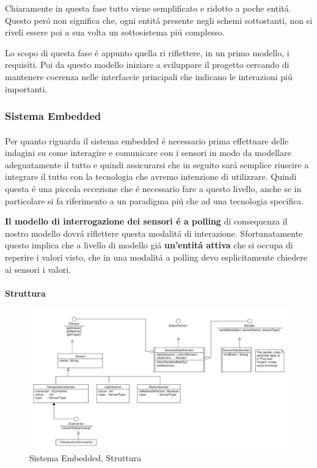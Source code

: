 Chiaramente in questa fase tutto viene semplificato e ridotto a poche entit\'a. Questo per\'o non significa che, ogni entit\'a presente negli schemi sottostanti, non si riveli essere poi a sua volta un sottosistema pi\'u complesso.

Lo scopo di questa fase \'e appunto quella ri riflettere, in un primo modello, i requisiti. Poi da questo modello iniziare a sviluppare il progetto cercando di mantenere coerenza nelle interfaccie principali che indicano le interazioni pi\'u importanti.

\subsubsection{Sistema Embedded}

\paragraph{}Per quanto riguarda il sistema embedded \'e necessario prima effettuare delle indagini su come interagire e comunicare con i sensori in modo da modellare adeguatamente il tutto e quindi assicurarsi che in seguito sar\'a semplice riuscire a integrare il tutto con la tecnologia che avremo intenzione di utilizzare. Quindi questa \'e una piccola eccezione che \'e necessario fare a questo livello, anche se in particolare si fa riferimento a un paradigma pi\'u che ad una tecnologia specifica.

\textbf{Il modello di interrogazione dei sensori \'e a polling} di consequenza il nostro modello dovr\'a riflettere questa modalit\'a di interazione. Sfortunatamente questo implica che a livello di modello gi\'a \textbf{un'entit\'a attiva} che si occupa di reperire i valori visto, che in una modalit\'a a polling devo esplicitamente chiedere ai sensori i valori.

\paragraph{Struttura}

\begin{figure}[H]
\centering
\includegraphics[width=\textwidth]{Figures/DomainModel/EmbeddedSystem/Structure.jpg}
\caption{Sistema Embedded, Struttura}
\end{figure}

